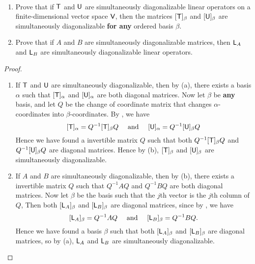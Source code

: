 \begin{exercise} \label{exercise 5.2.18} \ 

\begin{enumerate}
\sloppy \item Prove that if \(\textsf{T}\) and \(\textsf{U}\) are simultaneously diagonalizable linear operators on a finite-dimensional vector space \(\textsf{V}\), then the matrices \([\textsf{T}]_{\beta}\) and \([\textsf{U}]_{\beta}\) are simultaneously diagonalizable \textbf{for any} ordered basis \(\beta\).
\item Prove that if \(A\) and \(B\) are simultaneously diagonalizable matrices, then \(\textsf{L}_A\) and \(\textsf{L}_B\) are simultaneously diagonalizable linear operators.
\end{enumerate}
\end{exercise}

\begin{proof} \ 

\begin{enumerate}
\item If \(\textsf{T}\) and \(\textsf{U}\) are simultaneously diagonalizable, then by (a), there exists a basis \(\alpha\) such that \([\textsf{T}]_{\alpha}\) and \([\textsf{U}]_{\alpha}\) are both diagonal matrices.
Now let \(\beta\) be \textbf{any} basis, and let \(Q\) be the change of coordinate matrix that changes \(\alpha\)-coordinates into \(\beta\)-coordinates.
By , we have
\[
    [\textsf{T}]_{\alpha} = Q^{-1} [\textsf{T}]_{\beta} Q
    \quad \text{ and } \quad
    [\textsf{U}]_{\alpha} = Q^{-1} [\textsf{U}]_{\beta} Q
\]
Hence we have found a invertible matrix \(Q\) such that both \(Q^{-1} [\textsf{T}]_{\beta} Q\) and \(Q^{-1} [\textsf{U}]_{\beta} Q\) are diagonal matrices.
Hence by (b), \([\textsf{T}]_{\beta}\) and \([\textsf{U}]_{\beta}\) are simultaneously diagonalizable.

\item If \(A\) and \(B\) are simultaneously diagonalizable, then by (b), there exists a invertible matrix \(Q\) such that \(Q^{-1} A Q\) and \(Q^{-1} B Q\) are both diagonal matrices.
Now let \(\beta\) be the basis such that the \(j\)th vector is the \(j\)th column of \(Q\),
Then both \([\textsf{L}_A]_{\beta}\) and \([\textsf{L}_B]_{\beta}\) are diagonal matrices, since by , we have
\[
    [\textsf{L}_A]_{\beta} = Q^{-1} A Q
    \quad \text{ and } \quad
    [\textsf{L}_B]_{\beta} = Q^{-1} B Q.
\]
Hence we have found a basis \(\beta\) such that both \([\textsf{L}_A]_{\beta}\) and \([\textsf{L}_B]_{\beta}\) are diagonal matrices,
so by (a), \(\textsf{L}_A\) and \(\textsf{L}_B\) are simultaneously diagonalizable.
\end{enumerate}
\end{proof}

